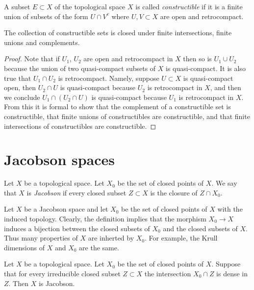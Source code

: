 \begin{definition}
\label{definition-constructible}
A subset $E \subset X$ of the topological space $X$ is called
{\it constructible} if it is a finite union of subsets
of the form $U \cap V^c$ where $U,V \subset X$ are open and
retrocompact.
\end{definition}

\begin{lemma}
\label{lemma-constructible}
The collection of constructible sets is closed under
finite intersections, finite unions and complements.
\end{lemma}

\begin{proof}
Note that if $U_1$, $U_2$ are open and retrocompact in $X$
then so is $U_1 \cup U_2$ because the union of two quasi-compact
subsets of $X$ is quasi-compact. It is also true that 
$U_1 \cap U_2$ is retrocompact. Namely, suppose $U \subset X$
is quasi-compact open, then $U_2 \cap U$ is quasi-compact because
$U_2$ is retrocompact in $X$, and then we conclude
$U_1 \cap (U_2 \cap U)$ is quasi-compact because $U_1$ is
retrocompact in $X$. From this it is formal to show that
the complement of a constructible set is constructible,
that finite unions of constructibles are constructible, and
that finite intersections of constructibles are constructible.
\end{proof}



\section{Jacobson spaces}
\label{section-space-jacobson}

\begin{definition}
\label{definition-space-jacobson}
Let $X$ be a topological space.
Let $X_0$ be the set of closed points of $X$.
We say that $X$ is {\it Jacobson} if every
closed subset $Z \subset X$ is the closure
of $Z \cap X_0$.
\end{definition}

\noindent
Let $X$ be a Jacobson space and let $X_0$ be the set
of closed points of $X$ with the induced topology.
Clearly, the definition implies that the morphism
$X_0 \to X$ induces a bijection between the closed
subsets of $X_0$ and the closed subsets of $X$.
Thus many properties of $X$ are inherted by $X_0$.
For example, the Krull dimensions of $X$ and $X_0$
are the same.

\begin{lemma}
\label{lemma-jacobson-check-irreducible-closed}
Let $X$ be a topological space. Let $X_0$ be the set
of closed points of $X$.
Suppose that for every irreducible closed subset $Z \subset X$
the intersection $X_0 \cap Z$ is dense in $Z$.
Then $X$ is Jacobson.
\end{lemma}

